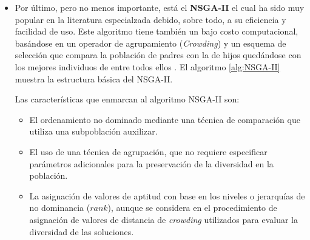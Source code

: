 \begin{itemize}
  \begin{algorithm}
      \begin{algorithmic}[1]			
	\REQUIRE Problema de Optimizaci\'on $F$.
	\ENSURE Una aproximaci\'on al frente de Pareto.
	\STATE $t \leftarrow 0$
	\STATE Inicializar la poblaci\'on aleatoriamente $P_t$
	    \STATE Generar un nuevo individuo $x$ de acuerdo con un operador de variaci\'on aleatoria.
	    \STATE $Q_{t+1}\leftarrow P_t \cup \left\{x \right\}$.
	    \STATE Calcular el frente de Pareto de acuerdo con la asignaci\'on de valores de aptitud con base en los niveles o jerarqu\'ias 
	    de no dominancia ($rank$) de $Q_{t+1}$.
	    \STATE $W \leftarrow$ individuos con la peor clasificaci\'on del frente.
	    \STATE $r \leftarrow$ individuos (en $W$) que menos contribuyen al valor del hipervolumen cubierto por $W$.
	    \STATE $P_{t+1}\leftarrow Q_{t+1} \diagup r$, eliminar los peores inviduos detectados de la poblaci\'on.
	    \STATE $t \leftarrow t +1$.
	\ENDWHILE
      \end{algorithmic}
  \caption{Estructura b\'asica del SMS-EMOA}
  \label{alg:SMS-EMOA}
  \end{algorithm}
 
  \item Por \'ultimo, pero no menos importante, est\'a el \textbf{NSGA-II} el cual ha sido muy popular 
  en la literatura especialzada debido,  sobre todo, a su eficiencia y facilidad de uso. Este algoritmo tiene tambi\'en un bajo 
  costo computacional, bas\'andose en un operador de agrupamiento (\textit{Crowding}) y un esquema de selecci\'on que compara la 
  poblaci\'on de padres con la de hijos qued\'andose con los mejores individuos de entre todos ellos \cite{deb02}. 
  El algoritmo \ref{alg:NSGA-II} muestra la estructura b\'asica del NSGA-II.
  
  Las caracter\'isticas que enmarcan al algoritmo NSGA-II son:
  
  \begin{itemize}
   \item El ordenamiento no dominado mediante una t\'ecnica de comparaci\'on que utiliza una subpoblaci\'on auxilizar.
   \item El uso de una t\'ecnica de agrupaci\'on, que no requiere especificar par\'ametros adicionales para la preservaci\'on
   de la diversidad en la poblaci\'on.
   \item La asignaci\'on de valores de aptitud con base en los niveles o jerarqu\'ias de no dominancia ($rank$), aunque se considera 
   en el procedimiento de asignaci\'on de valores de distancia de \textit{crowding} utilizados para evaluar la diversidad de las 
   soluciones.
  \end{itemize}



\end{itemize}

